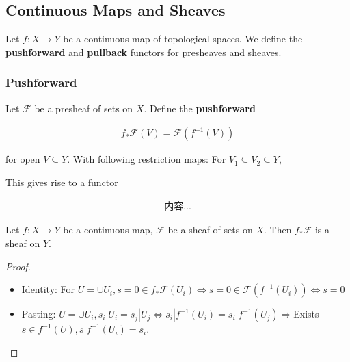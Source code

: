 \documentclass[Total.tex]{subfiles}
\begin{document}
			\subsection{Continuous Maps and Sheaves}
			
				
				Let $f:X\rightarrow Y$ be a continuous map of topological spaces. We define the \textbf{pushforward} and \textbf{pullback} functors for presheaves and sheaves.
				\subsubsection{Pushforward}
				
				\begin{Def}
				
				Let $\mathcal{F}$ be a presheaf of sets on $X$. Define the \textbf{pushforward}
				
				\begin{gather*}
					f_*\mathcal{F}(V)=\mathcal{F}(f^{-1}(V))
				\end{gather*}
				
				for open $V\subseteq Y$. With following restriction maps: For $V_1\subseteq V_2\subseteq Y$,
				
				\begin{center}
				\end{center}
				
				This gives rise to a functor
				
				\begin{gather*}
					内容...
				\end{gather*}
				
				\end{Def}
				
				\begin{lemma}
					Let $f:X\rightarrow Y$ be a continuous map, $\mathcal{F}$ be a sheaf of sets on $X$. Then $f_*\mathcal{F}$ is a sheaf on $Y$.
				\end{lemma}
				
				\begin{proof}
					\begin{itemize}
						\item Identity: For $U=\cup U_i,s=0\in f_*\mathcal{F}(U_i)\Leftrightarrow s=0\in \mathcal{F}(f^{-1}(U_i))\Leftrightarrow s=0$
						\item Pasting: $U=\cup U_i,s_i|U_i=s_j|U_j\Leftrightarrow s_i|f^{-1}(U_i)=s_i|f^{-1}(U_j)\Rightarrow $Exists $s\in f^{-1}(U),s|f^{-1}(U_i)=s_i$.
					\end{itemize}
				\end{proof}
				
\end{document}
